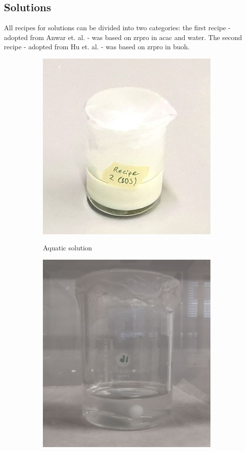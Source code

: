 \subsection{Solutions}\label{sec:exp-sol}
All recipes for solutions can be divided into two categories:
the first recipe - adopted from Anwar et. al. \cite{Anwar2017} - was based on \gls{zrpro} in \gls{acac} and \gls{water}.
The second recipe - adopted from Hu et. al. \cite{Hu2016} - was based on \gls{zrpro} in \gls{buoh}.

\begin{figure}[htb]
	\centering
	\begin{subfigure}{0.49\textwidth}
		\centering
		\includegraphics[height=0.8\textwidth]{Pics/sol-aq.png}
		\label{fig:sol-aq}
		\caption{Aquatic solution}
	\end{subfigure}
	\begin{subfigure}{0.49\textwidth}
		\centering
		\includegraphics[height=0.8\textwidth]{Pics/sol-bu.png}

\end{subfigure}
\end{figure}
